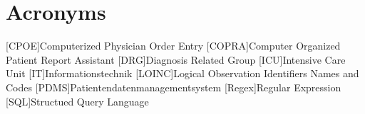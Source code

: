 \chapter*{Acronyms}
    \begin{acronym}[loinccopra]
    	
    	[CPOE]{Computerized Physician Order Entry}
    	[COPRA]{Computer Organized Patient Report Assistant}
    	[DRG]{Diagnosis Related Group}
    	[ICU]{Intensive Care Unit}
    	[IT]{Informationstechnik}
    	[LOINC]{Logical Observation Identifiers Names and Codes}
    	[PDMS]{Patientendatenmanagementsystem}
    	[Regex]{Regular Expression}
    	[SQL]{Structued Query Language}
    	
    \end{acronym}